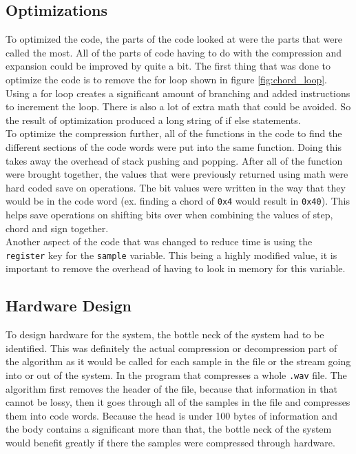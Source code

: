 \documentclass[12pt]{article}
\begin{document}
\subsection{Optimizations}

To optimized the code, the parts of the code looked at were the parts that were called the most. All of the parts of code having to do with the compression and expansion could be improved by quite a bit. The first thing that was done to optimize the code is to remove the for loop shown in figure \ref{fig:chord_loop}. Using a for loop creates a significant amount of branching and added instructions to increment the loop. There is also a lot of extra math that could be avoided. So the result of optimization produced a long string of if else statements. \\

To optimize the compression further, all of the functions in the code to find the different sections of the code words were put into the same function. Doing this takes away the overhead of stack pushing and popping. After all of the function were brought together, the values that were previously returned using math were hard coded save on operations. The bit values were written in the way that they would be in the code word (ex. finding a chord of \texttt{0x4} would result in \texttt{0x40}). This helps save operations on shifting bits over when combining the values of step, chord and sign together. \\

Another aspect of the code that was changed to reduce time is using the \texttt{register} key for the  \texttt{sample} variable. This being a highly modified value, it is important to remove the overhead of having to look in memory for this variable.\\

\subsection{Hardware Design}

To design hardware for the system, the bottle neck of the system had to be identified. This was definitely the actual compression or decompression part of the algorithm as it would be called for each sample in the file or the stream going into or out of the system. In the program that compresses a whole \texttt{.wav} file. The algorithm first removes the header of the file, because that information in that cannot be lossy, then it goes through all of the samples in the file and compresses them into code words. Because the head is under 100 bytes of information and the body contains a significant more than that, the bottle neck of the system would benefit greatly if there the samples were compressed through hardware. \\
\end{document}
